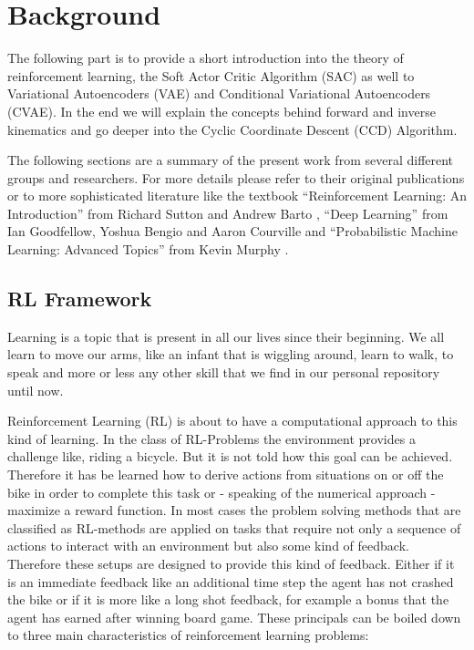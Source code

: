 \chapter{Background}\label{chap:background}

The following part is to provide a short introduction into the theory of reinforcement learning, the Soft Actor Critic Algorithm (SAC) as well to Variational Autoencoders (VAE) and Conditional Variational Autoencoders (CVAE). In the end we will explain the concepts behind forward and inverse kinematics and go deeper into the Cyclic Coordinate Descent (CCD) Algorithm.

The following sections are a summary of the present work from several different groups and researchers. For more details please refer to their original publications or to more sophisticated literature like the textbook ``Reinforcement Learning: An Introduction'' from Richard Sutton and Andrew Barto \cite{SuttonBartoRLBook}, ``Deep Learning'' from Ian Goodfellow, Yoshua Bengio and Aaron Courville \cite{DeepLearningTextBook} and ``Probabilistic Machine Learning: Advanced Topics'' from Kevin Murphy \cite{pml2Book}. 

\section{RL Framework}\label{sec:RL-Framework}

Learning is a topic that is present in all our lives since their beginning. We all learn to move our arms, like an infant that is wiggling around, learn to walk, to speak and more or less any other skill that we find in our personal repository until now.  

Reinforcement Learning (RL) is about to have a computational approach to this kind of learning.
In the class of RL-Problems the environment provides a challenge like, riding a bicycle. But it is not told how this goal can be achieved.  Therefore it has be learned how to derive actions from situations on or off the bike in order to complete this task or - speaking of the numerical approach - maximize a reward function.
In most cases the problem solving methods that are classified as RL-methods are applied on tasks that require not only a sequence of actions to interact with an environment but also some kind of feedback.
Therefore these setups are designed to provide this kind of feedback. Either if it is an immediate feedback like an additional time step the agent has not crashed the bike or if it is more like a long shot feedback, for example a bonus that the agent has earned after winning board game. 
These principals can be boiled down to three main characteristics of reinforcement learning problems:

